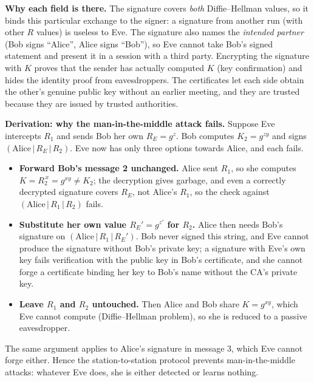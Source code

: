 \textbf{Why each field is there.} The signature covers \emph{both} Diffie--Hellman values, so it binds this particular exchange to the signer: a signature from another run (with other $R$ values) is useless to Eve. The signature also names the \emph{intended partner} (Bob signs ``Alice'', Alice signs ``Bob''), so Eve cannot take Bob's signed statement and present it in a session with a third party. Encrypting the signature with $K$ proves that the sender has actually computed $K$ (key confirmation) and hides the identity proof from eavesdroppers. The certificates let each side obtain the other's genuine public key without an earlier meeting, and they are trusted because they are issued by trusted authorities.

\textbf{Derivation: why the man-in-the-middle attack fails.} Suppose Eve intercepts $R_1$ and sends Bob her own $R_E = g^z$. Bob computes $K_2 = g^{zy}$ and signs $(\text{Alice} \,|\, R_E \,|\, R_2)$. Eve now has only three options towards Alice, and each fails.
\begin{itemize}
  \item \textbf{Forward Bob's message 2 unchanged.} Alice sent $R_1$, so she computes $K = R_2^{\,x} = g^{xy} \ne K_2$; the decryption gives garbage, and even a correctly decrypted signature covers $R_E$, not Alice's $R_1$, so the check against $(\text{Alice} \,|\, R_1 \,|\, R_2)$ fails.
  \item \textbf{Substitute her own value $R_E' = g^{z'}$ for $R_2$.} Alice then needs Bob's signature on $(\text{Alice} \,|\, R_1 \,|\, R_E')$. Bob never signed this string, and Eve cannot produce the signature without Bob's private key; a signature with Eve's own key fails verification with the public key in Bob's certificate, and she cannot forge a certificate binding her key to Bob's name without the CA's private key.
  \item \textbf{Leave $R_1$ and $R_2$ untouched.} Then Alice and Bob share $K = g^{xy}$, which Eve cannot compute (Diffie--Hellman problem), so she is reduced to a passive eavesdropper.
\end{itemize}
The same argument applies to Alice's signature in message 3, which Eve cannot forge either. Hence the station-to-station protocol prevents man-in-the-middle attacks: whatever Eve does, she is either detected or learns nothing.

